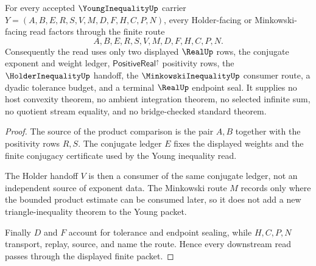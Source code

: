 \begin{theorem}\label{thm:young-inequality-holder-minkowski-handoff}
For every accepted $\YoungInequalityUp$ carrier $Y=(A,B,E,R,S,V,M,D,F,H,C,P,N)$, every Holder-facing or Minkowski-facing read factors through the finite route
$$
A,B,E,R,S,V,M,D,F,H,C,P,N.
$$
Consequently the read uses only two displayed $\RealUp$ rows, the conjugate exponent and weight ledger, $\mathsf{PositiveReal}^{\uparrow}$ positivity rows, the $\HolderInequalityUp$ handoff, the $\MinkowskiInequalityUp$ consumer route, a dyadic tolerance budget, and a terminal $\RealUp$ endpoint seal. It supplies no host convexity theorem, no ambient integration theorem, no selected infinite sum, no quotient stream equality, and no bridge-checked standard theorem.
\end{theorem}
\begin{proof}
The source of the product comparison is the pair $A,B$ together with the positivity rows $R,S$. The conjugate ledger $E$ fixes the displayed weights and the finite conjugacy certificate used by the Young inequality read.

The Holder handoff $V$ is then a consumer of the same conjugate ledger, not an independent source of exponent data. The Minkowski route $M$ records only where the bounded product estimate can be consumed later, so it does not add a new triangle-inequality theorem to the Young packet.

Finally $D$ and $F$ account for tolerance and endpoint sealing, while $H,C,P,N$ transport, replay, source, and name the route. Hence every downstream read passes through the displayed finite packet.
\end{proof}



